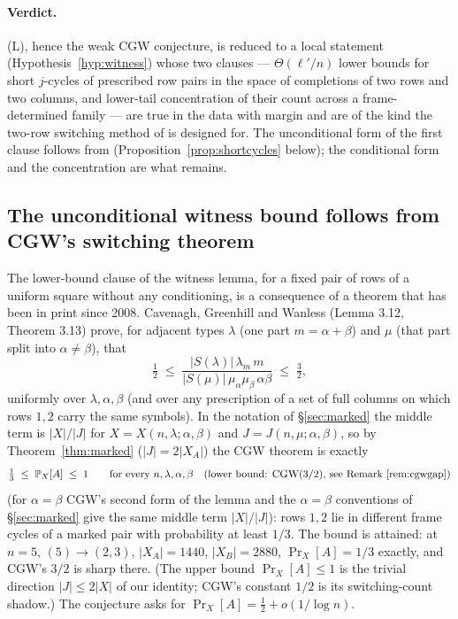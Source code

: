 \paragraph{Verdict.}  (L), hence the weak CGW conjecture, is reduced
to a local statement (Hypothesis~\ref{hyp:witness}) whose two clauses
--- $\Theta(\ell'/n)$ lower bounds for short $j$-cycles of prescribed
row pairs in the space of completions of two rows and two columns, and
lower-tail concentration of their count across a frame-determined
family --- are true in the data with margin and are of the kind the
two-row switching method of \cite{CGW08,KS18} is designed for.  The
unconditional form of the first clause follows from \cite{CGW08}
(Proposition~\ref{prop:shortcycles} below); the conditional form and
the concentration are what remains.

\subsection{The unconditional witness bound follows from CGW's switching theorem}
\label{sec:cgwcycles}

The lower-bound clause of the witness lemma, for a fixed pair of rows
of a uniform square without any conditioning, is a consequence of a
theorem that has been in print since 2008.  Cavenagh, Greenhill and
Wanless \cite{CGW08} (Lemma 3.12, Theorem 3.13) prove, for adjacent
types $\lambda$ (one part $m=\alpha+\beta$) and $\mu$ (that part split
into $\alpha\ne\beta$), that
\[
\tfrac12\;\le\;\frac{|S(\lambda)|\,\lambda_m\,m}{|S(\mu)|\,\mu_\alpha\mu_\beta\,\alpha\beta}
\;\le\;\tfrac32 ,
\]
uniformly over $\lambda,\alpha,\beta$ (and over any prescription of a
set of full columns on which rows $1,2$ carry the same symbols).  In
the notation of \S\ref{sec:marked} the middle term is $|X|/|J|$ for
$X=X(n,\lambda;\alpha,\beta)$ and $J=J(n,\mu;\alpha,\beta)$, so by
Theorem~\ref{thm:marked} ($|J|=2|X_A|$) the CGW theorem is exactly
\begin{equation}\label{eq:cgwA}
\tfrac13\;\le\;\Pr_X[A]\;\le\;1
\qquad\text{for every }n,\lambda,\alpha,\beta\quad\text{(lower bound: CGW($3/2$), see Remark~\ref{rem:cgwgap})}
\end{equation}
(for $\alpha=\beta$ CGW's second form of the lemma and the $\alpha=\beta$
conventions of \S\ref{sec:marked} give the same middle term $|X|/|J|$):
rows $1,2$ lie in different frame cycles of a marked pair with
probability at least $1/3$.  The bound is attained: at $n=5$,
$(5)\to(2,3)$, $|X_A|=1440$, $|X_B|=2880$, $\Pr_X[A]=1/3$ exactly, and
CGW's $3/2$ is sharp there.  (The upper bound $\Pr_X[A]\le1$ is the
trivial direction $|J|\le2|X|$ of our identity; CGW's constant $1/2$
is its switching-count shadow.)  The conjecture asks for $\Pr_X[A]=\frac12+o(1/\log n)$.


